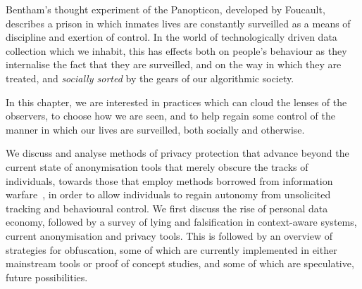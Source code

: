 \documentclass{IOS-Book-Article}     %
\begin{document}


Bentham's thought experiment of the Panopticon, developed by Foucault, describes
a prison in which inmates lives are constantly surveilled as a means of
discipline and exertion of control.  In the world of technologically driven 
data collection which we inhabit, this has effects both on people's behaviour as
they internalise the fact that they are surveilled, and on the way in which they
are treated, and \emph{socially sorted} by the gears of our algorithmic
society\cite{simon2005Panopticism}.

In this chapter, we are interested in practices which can cloud the lenses of the observers, to
choose how we are seen, and to help regain some control of
the manner in which our lives are surveilled, both socially and otherwise.


We discuss and analyse methods of privacy protection that
advance beyond the current state of anonymisation tools that merely obscure the tracks
of individuals, towards those that employ methods borrowed from
information warfare~\cite{gursestranslating,lyon2007surveillance}, in order to allow individuals to regain autonomy
from unsolicited tracking and behavioural control.  We first discuss the rise of 
personal data economy, followed by a survey of lying and falsification in context-aware 
systems, current anonymisation and privacy tools. This is followed by an overview of
strategies for obfuscation, some of which are currently implemented in either
mainstream tools or proof of concept studies,  and some of which are
speculative, future possibilities.
\end{document}
